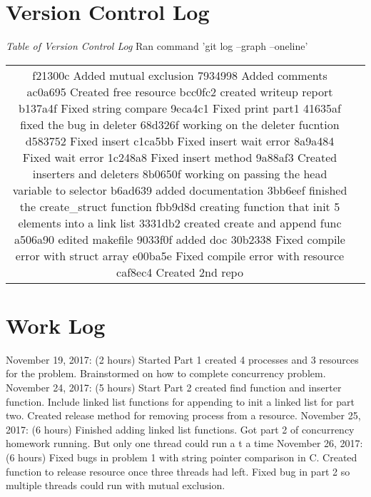 \documentclass{article}
\begin{document}
\section*{Version Control Log}
\textit{Table of Version Control Log} Ran command 'git log --graph --oneline'
\newline
\begin{center}
\begin{tabular}{ c c }
f21300c Added mutual exclusion
7934998 Added comments
ac0a695 Created free resource
bcc0fc2 created writeup report
b137a4f Fixed string compare
9eca4c1 Fixed print part1
41635af fixed the bug in deleter
68d326f working on the deleter fucntion
d583752 Fixed insert
c1ca5bb Fixed insert wait error
8a9a484 Fixed wait error
1c248a8 Fixed insert method
9a88af3 Created inserters and deleters
8b0650f working on passing the head variable to selector
b6ad639 added documentation
3bb6eef finished the create_struct function
fbb9d8d creating function that init 5 elements into a link list
3331db2 created create and append func
a506a90 edited makefile
9033f0f added doc
30b2338 Fixed compile error with struct array
e00ba5e Fixed compile error with resource
caf8ec4 Created 2nd repo

\end{tabular}
\end{center}

\section*{Work Log}
November 19, 2017: (2 hours) Started Part 1 created 4 processes and 3 resources for the problem. Brainstormed on how to complete concurrency problem.
November 24, 2017: (5 hours) Start Part 2 created find function and inserter function. Include linked list functions for appending to init a linked list for part two. Created release method for removing process from a resource.
November 25, 2017: (6 hours) Finished adding linked list functions. Got part 2 of concurrency homework running. But only one thread could run a t a time
November 26, 2017: (6 hours) Fixed bugs in problem 1 with string pointer comparison in C. Created function to release resource once three threads had left. Fixed bug in part 2 so multiple threads could run with mutual exclusion.
\end{document}

